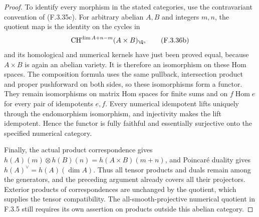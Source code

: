 \begin{proof}
To identify every morphism in the stated categories, use the
contravariant convention of (F.3.35c). For arbitrary abelian
\(A,B\) and integers \(m,n\), the quotient map is the identity on
the cycles in
\[
 \operatorname{CH}^{\dim A+n-m}(A\times B)_{\Q},
                                                        \tag{F.3.36b}
\]
and its homological and numerical kernels have just been proved
equal, because \(A\times B\) is again an abelian variety. It is
therefore an isomorphism on these Hom spaces. The composition
formula uses the same pullback, intersection product and proper
pushforward on both sides, so these isomorphisms form a functor.
They remain isomorphisms on matrix Hom spaces for finite sums and
on \(f\operatorname{Hom}e\) for every pair of idempotents \(e,f\).
Every numerical idempotent lifts uniquely through the endomorphism
isomorphism, and injectivity makes the lift idempotent. Hence the
functor is fully faithful and essentially surjective onto the
specified numerical category.

Finally, the actual product correspondence gives
\(h(A)(m)\otimes h(B)(n)=h(A\times B)(m+n)\), and Poincar\'e
duality gives \(h(A)^{\vee}=h(A)(\dim A)\). Thus all tensor
products and duals remain among the generators, and the preceding
argument already covers all their projectors. Exterior products
of correspondences are unchanged by the quotient, which supplies
the tensor compatibility. The all-smooth-projective numerical
quotient in F.3.5 still requires its own assertion on products
outside this abelian category.
\end{proof}
